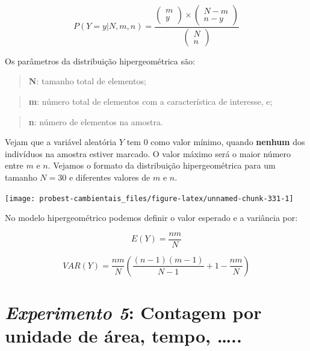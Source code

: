 \documentclass[
]{book}
\begin{document}
\[P(Y=y|N,m,n) = \frac{\left (\begin{array}{c} m \\ y \end{array}\right) \times \left (\begin{array}{c} N-m \\ n-y \end{array}\right)}{\left (\begin{array}{c} N \\ n \end{array}\right)}\]

Os parâmetros da distribuição hipergeométrica são:

\begin{quote}
\textbf{N}: tamanho total de elementos;
\end{quote}

\begin{quote}
\textbf{m}: número total de elementos com a característica de interesse, e;
\end{quote}

\begin{quote}
\textbf{n}: número de elementos na amostra.
\end{quote}

Vejam que a variável aleatória \(Y\) tem \(0\) como valor mínimo, quando \textbf{nenhum} dos indivíduos na amostra estiver marcado. O valor máximo será o maior número entre \(m\) e \(n\). Vejamos o formato da distribuição hipergeométrica para um tamanho \(N = 30\) e diferentes valores de \(m\) e \(n\).

\begin{center}\texttt{[image: probest-cambientais\_files/figure-latex/unnamed-chunk-331-1]} \end{center}

No modelo hipergeométrico podemos definir o valor esperado e a variância por:

\[E(Y) = \frac{n m}{N}\]

\[VAR(Y) = \frac{n m}{N}(\frac{(n-1)(m-1)}{N-1}+1-\frac{n m}{N})\]

\hypertarget{experimento-5-contagem-por-unidade-de-uxe1rea-tempo-..}{%
\section{\texorpdfstring{\emph{Experimento 5}: Contagem por unidade de área, tempo, \ldots..}{Experimento 5: Contagem por unidade de área, tempo, \ldots..}}\label{experimento-5-contagem-por-unidade-de-uxe1rea-tempo-..}}
\end{document}
